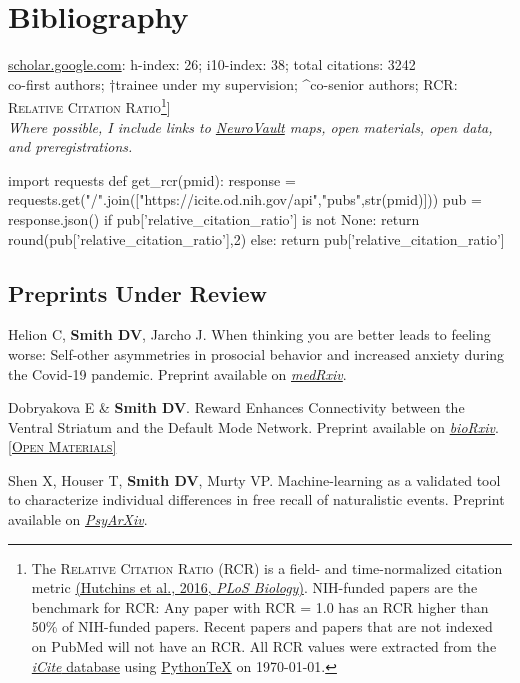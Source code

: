 \documentclass[11pt, letterpaper]{article}
\newcommand{\psyarxiv}[1]{\href{#1}{\textit{PsyArXiv}}}
\newcommand{\biorxiv}[1]{\href{#1}{\textit{bioRxiv}}}
\newcommand{\medrxiv}[1]{\href{#1}{\textit{medRxiv}}}
\newcommand{\materials}[1]{\href{#1}{\scriptsize\textsc{[Open Materials]}}}
\newcommand{\pytex}{Python\TeX}
\begin{document}
\pagebreak
\section*{Bibliography}
\aiGoogleScholar \hspace{.01cm} \href{https://scholar.google.com/citations?user=czV7OcQAAAAJ&hl=en}{scholar.google.com}: h-index: 26; i10-index: 38; total citations: 3242 \\ 
\lbrack*co-first authors; †trainee under my supervision; \^{}co-senior authors; RCR: \textsc{Relative Citation Ratio}\footnote{The \textsc{Relative Citation Ratio} (RCR) is a field- and time-normalized citation metric \href{http://journals.plos.org/plosbiology/article?id=10.1371/journal.pbio.1002541}{(Hutchins et al., 2016, \textit{PLoS Biology})}. NIH-funded papers are the benchmark for RCR: Any paper with RCR = 1.0 has an RCR higher than 50\% of NIH-funded papers. Recent papers and papers that are not indexed on PubMed will not have an RCR. All RCR values were extracted from the \href{https://icite.od.nih.gov/stats}{\textit{iCite} database} using \href{https://github.com/gpoore/pythontex}{\pytex} on \today.}] \\ 

\textit{Where possible, I include links to \href{https://neurovault.org}{NeuroVault} maps, open materials, open data, and preregistrations.}


\begin{pycode}
import requests
def get_rcr(pmid):
  response = requests.get("/".join(["https://icite.od.nih.gov/api","pubs",str(pmid)]))
  pub = response.json()
  if pub['relative_citation_ratio'] is not None:
    return round(pub['relative_citation_ratio'],2)
  else:
    return pub['relative_citation_ratio']
\end{pycode}


\subsection*{Preprints Under Review}

\begin{hangparas}{.5in}{1}

Helion C, \textbf{Smith DV}, Jarcho J. When thinking you are better leads to feeling worse: Self-other asymmetries in prosocial behavior and increased anxiety during the Covid-19 pandemic. Preprint available on \medrxiv{https://doi.org/10.1101/2021.02.26.21252547}.

Dobryakova E \& \textbf{Smith DV}. Reward Enhances Connectivity between the Ventral Striatum and the Default Mode Network. Preprint available on \biorxiv{https://doi.org/10.1101/2021.07.28.454086}. \materials{https://github.com/edobryakova/DobryakovaSmith_HCP}

Shen X, Houser T, \textbf{Smith DV}, Murty VP. Machine-learning as a validated tool to characterize individual differences in free recall of naturalistic events. Preprint available on \psyarxiv{https://doi.org/10.31234/osf.io/uygzv}. \\


\end{hangparas}
\end{document}

